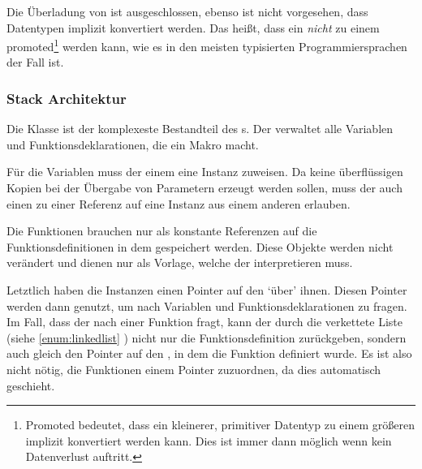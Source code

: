       Die Überladung von  ist ausgeschlossen, ebenso ist nicht vorgesehen, dass Datentypen implizit konvertiert werden. Das heißt, dass ein  \emph{nicht} zu einem  promoted\footnote{
        Promoted bedeutet, dass ein kleinerer, primitiver Datentyp zu einem größeren implizit konvertiert werden kann. Dies ist immer dann möglich wenn kein Datenverlust auftritt.
      } werden kann, wie es in den meisten typisierten Programmiersprachen der Fall ist.

    \subsubsection{Stack Architektur}
    \label{sssec:Stack Architektur}
      Die  Klasse ist der komplexeste Bestandteil des s. Der  verwaltet alle Variablen und Funktionsdeklarationen, die ein Makro macht.

      Für die Variablen muss der  einem  eine  Instanz zuweisen. Da keine überflüssigen Kopien bei der Übergabe von Parametern erzeugt werden sollen, muss der  auch einen  zu einer Referenz auf eine  Instanz aus einem anderen  erlauben.

      Die Funktionen brauchen nur als konstante Referenzen auf die Funktionsdefinitionen in dem  gespeichert werden. Diese Objekte werden nicht verändert und dienen nur als Vorlage, welche der  interpretieren muss.

      Letztlich haben die  Instanzen einen Pointer auf den
       `über' ihnen. %
      Diesen Pointer werden dann genutzt, um nach Variablen und Funktionsdeklarationen zu fragen. Im Fall, dass der  nach einer Funktion fragt, kann der  durch die verkettete Liste (siehe
      \ref{enum:linkedlist} %
      ) nicht nur die Funktionsdefinition zurückgeben, sondern auch gleich den Pointer auf den , in dem die Funktion definiert wurde. Es ist also nicht nötig, die Funktionen einem  Pointer zuzuordnen, da dies automatisch geschieht.


